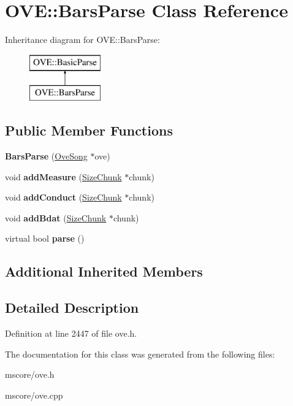 \hypertarget{class_o_v_e_1_1_bars_parse}{}\section{O\+VE\+:\+:Bars\+Parse Class Reference}
\label{class_o_v_e_1_1_bars_parse}
Inheritance diagram for O\+VE\+:\+:Bars\+Parse\+:\begin{figure}[H]
\begin{center}
\leavevmode
\includegraphics[height=2.000000cm]{class_o_v_e_1_1_bars_parse}
\end{center}
\end{figure}
\subsection*{Public Member Functions}
\begin{DoxyCompactItemize}
\item 
\mbox{\label{class_o_v_e_1_1_bars_parse_ac76d6f75f5d54cb91d7fbf2b76d6bcdf}} 
{\bfseries Bars\+Parse} (\hyperlink{class_o_v_e_1_1_ove_song}{Ove\+Song} $\ast$ove)
\item 
\mbox{\label{class_o_v_e_1_1_bars_parse_ab449075666f18e14535862a018ad5a3f}} 
void {\bfseries add\+Measure} (\hyperlink{class_o_v_e_1_1_size_chunk}{Size\+Chunk} $\ast$chunk)
\item 
\mbox{\label{class_o_v_e_1_1_bars_parse_a41437ed958a0ecc42b442b4e1d1dd9ee}} 
void {\bfseries add\+Conduct} (\hyperlink{class_o_v_e_1_1_size_chunk}{Size\+Chunk} $\ast$chunk)
\item 
\mbox{\label{class_o_v_e_1_1_bars_parse_a91cc27703e2de34ccd9f074aa5d4e472}} 
void {\bfseries add\+Bdat} (\hyperlink{class_o_v_e_1_1_size_chunk}{Size\+Chunk} $\ast$chunk)
\item 
\mbox{\label{class_o_v_e_1_1_bars_parse_a095cfb8f29b4d4a63e5ee554278f58d9}} 
virtual bool {\bfseries parse} ()
\end{DoxyCompactItemize}
\subsection*{Additional Inherited Members}


\subsection{Detailed Description}


Definition at line 2447 of file ove.\+h.



The documentation for this class was generated from the following files\+:\begin{DoxyCompactItemize}
\item 
mscore/ove.\+h\item 
mscore/ove.\+cpp\end{DoxyCompactItemize}
